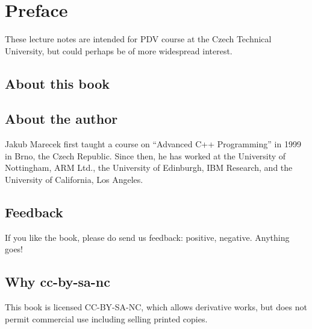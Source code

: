 \chapter{Preface}

These lecture notes are intended for PDV course at the Czech Technical University, but could perhaps be of more widespread interest. 

\section*{About this book}


\section*{About the author}

Jakub Marecek first taught a course on ``Advanced C++ Programming'' in 1999 in Brno, the Czech Republic. Since then, he has worked at the University of Nottingham, ARM Ltd., the University of Edinburgh, IBM Research, and the University of California, Los Angeles.

\section*{Feedback}

If you like the book, please do send us feedback: positive, negative. Anything goes!

\section*{Why cc-by-sa-nc}

This book is licensed CC-BY-SA-NC, which allows derivative works, but does not permit commercial use including selling printed copies. 